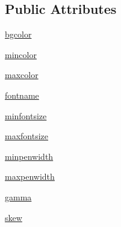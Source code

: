\subsection*{Public Attributes}
\begin{DoxyCompactItemize}
\item 
\hyperlink{classgprof2dot_1_1Theme_a03ec2d6e3ef9d5bb373eb8902d0850c1}{bgcolor}
\item 
\hyperlink{classgprof2dot_1_1Theme_a00ec5eb4463c40669d90777fcb516754}{mincolor}
\item 
\hyperlink{classgprof2dot_1_1Theme_aac427429b605176076ef276b7c62adf3}{maxcolor}
\item 
\hyperlink{classgprof2dot_1_1Theme_a92dc7ef2582a13e357d1778eaafed468}{fontname}
\item 
\hyperlink{classgprof2dot_1_1Theme_a600f16c1724620261101751c2c2cb743}{minfontsize}
\item 
\hyperlink{classgprof2dot_1_1Theme_ac823da653b341ea9d3d6d7b10c70ae57}{maxfontsize}
\item 
\hyperlink{classgprof2dot_1_1Theme_a1c96fe1a046d8111c3217c84f95b1ebb}{minpenwidth}
\item 
\hyperlink{classgprof2dot_1_1Theme_a4815ce3e9f2a3c5f191304ee09b4047f}{maxpenwidth}
\item 
\hyperlink{classgprof2dot_1_1Theme_a835bb978ff2b2e23753c7bf775c7ee2b}{gamma}
\item 
\hyperlink{classgprof2dot_1_1Theme_a758b69f6b1ce9361ff7b387a2424c0e4}{skew}
\end{DoxyCompactItemize}


